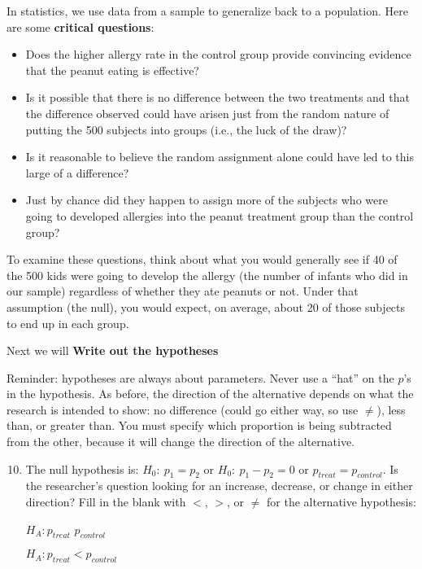    In statistics, we use data from a sample to generalize back to a
   population.  Here are some {\bf critical questions}:
   \begin{itemize}
   \item Does the higher allergy rate in the control group provide
     convincing evidence that the peanut eating is effective?
   \item Is it possible that there is no difference between the two
     treatments and that the difference observed could have arisen
     just from the random nature of putting the 500 subjects into
     groups (i.e., the luck of the draw)?
   \item Is it reasonable to believe the random assignment alone could
     have led to this large of a difference?
   \item Just by chance did they happen to assign
     more of the subjects who were going to developed allergies into the peanut
     treatment group than the control group?
   \end{itemize}
 
   To examine these questions, think about what you would generally see if 
   40 of the 500 kids were going to develop the allergy (the number of
   infants  who did in our sample) regardless of whether they ate
   peanuts or not. Under that assumption (the null), you would expect, on
   average, about 20 of those subjects to end up in each group. 

   \begin{center}
     Next we will {\bf Write out the hypotheses}
   \end{center}
  Reminder: hypotheses are always about parameters. Never use a ``hat''
   on the $p$'s in the hypothesis.  As before, the direction of the
   alternative depends on what the research is intended to show: no
   difference (could go either way, so use $\neq$), less than, or
   greater than.  You must specify which proportion is being
   subtracted from the other, because it will change the direction of
   the alternative.
 
 \begin{enumerate}
  \setcounter{enumi}{9}
   \item  The null hypothesis is: $H_0:\  p_1 = p_2$  or $H_0:\  p_1 -
     p_2 = 0$ or $p_{treat} =   p_{control}$. Is the researcher's question looking
     for an increase, decrease, or change in either direction?  Fill
     in the blank with $<$, $>$, or $\neq$ for the alternative
     hypothesis:  

\begin{students}
     $H_A:  p_{treat}$  \underline{\hspace{2cm}}   $p_{control}$
\end{students}
\begin{key}
   $H_A:  p_{treat} < p_{control}$
\end{key}     
\end{enumerate}

